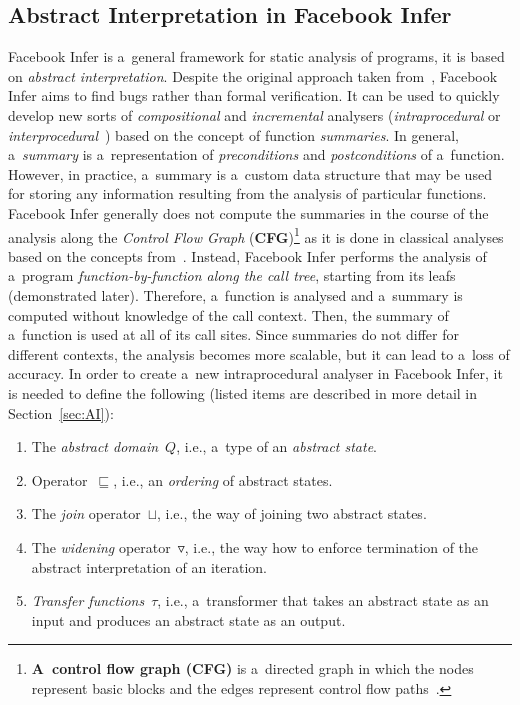 \subsection{Abstract Interpretation in Facebook Infer}
\label{sec:fbinferAI}

Facebook Infer is a~general framework for static analysis of programs, it is
based on \emph{abstract interpretation}. Despite the original approach
taken from~\cite{inferBiabduction}, Facebook Infer  aims to find bugs rather
than formal verification. It can be used to quickly develop new sorts of
\emph{compositional} and \emph{incremental} analysers (\emph{intraprocedural}
or \emph{interprocedural}~\cite{programAnalysisNielson}) based
on the concept of function \emph{summaries}. In general, a~\emph{summary}
is a~representation of \emph{preconditions} and \emph{postconditions} of
a~function. However, in practice, a~summary is a~custom data structure that
may be used for storing any information resulting from the analysis of
particular functions. Facebook Infer generally does not compute the summaries
in the course of the analysis along the \emph{Control Flow Graph}
(\textbf{CFG})\footnote{\textbf{A~control flow graph (CFG)} is a~directed
graph in which the nodes represent basic blocks and the edges represent control
flow paths~\cite{controlFlowAnalysisAllen}.} as it is done in classical
analyses based on the concepts from~\cite{DFAGraphReach,
DFAApproaches}. Instead, Facebook Infer performs the
analysis of a~program \emph{function-by-function along the call tree},
starting from its leafs (demonstrated later). Therefore, a~function
is analysed and a~summary is computed without knowledge of the
call context. Then, the summary of a~function is used at all of its call
sites. Since summaries do not differ for different contexts, the analysis
becomes more scalable, but it can lead to a~loss of accuracy. In order
to create a~new intraprocedural analyser in Facebook Infer, it is needed to
define the following (listed items are described in more detail in
Section~\ref{sec:AI}):
\begin{enumerate}
    \item
        The \emph{abstract domain}~$ Q $, i.e., a~type of an
        \emph{abstract state}.

    \item
        Operator~$ \sqsubseteq $, i.e., an \emph{ordering} of abstract
        states.

    \item
        The \emph{join} operator~$ \sqcup $, i.e., the way of joining two
        abstract states.

    \item
        The \emph{widening} operator~$ \triangledown $, i.e., the way how to
        enforce termination of the abstract interpretation of an iteration.

    \item
        \emph{Transfer functions}~$ \tau $, i.e., a~transformer that
        takes an abstract state as an input and produces an abstract state
        as an output.
\end{enumerate}
